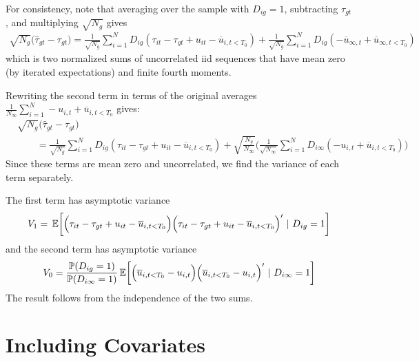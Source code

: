 \documentclass[12pt]{article}
\begin{document}
For consistency, note that averaging over the sample with $D_{ig} = 1$, subtracting $\tau_{gt}$, and multiplying $\sqrt{N_{g}}$ gives
\begin{align}
    \sqrt{N_{g}} \big( \widehat{\tau}_{gt} - \tau_{gt} \big) 
    = \frac{1}{\sqrt{N_{g}}}\sum_{i=1}^N D_{ig} (\tau_{it} - \tau_{gt} + u_{it} - \overline{u}_{i,t < T_0})
    + \frac{1}{\sqrt{N_{g}}}\sum_{i = 1}^N D_{ig} (- \overline{u}_{\infty,t} + \overline{u}_{\infty,t < T_0}) 
\end{align}
which is two normalized sums of uncorrelated iid sequences that have mean zero (by iterated expectations) and finite fourth moments. 

Rewriting the second term in terms of the original averages $\frac{1}{N_\infty} \sum_{i=1}^N - u_{i,t} + \overline{u}_{i,t < T_0}$ gives:
\begin{align*}
    &\sqrt{N_{g}} \big( \widehat{\tau}_{gt} - \tau_{gt} \big) \\
    &\qquad= \frac{1}{\sqrt{N_{g}}}\sum_{i=1}^N D_{ig} (\tau_{it} - \tau_{gt} + u_{it} - \overline{u}_{i,t < T_0})
    + \sqrt{\frac{N_g}{N_\infty}} \bigg ( \frac{1}{\sqrt{N_\infty}} \sum_{i = 1}^N D_{i\infty} (- u_{i,t} + \overline{u}_{i,t < T_0} ) \bigg)
\end{align*}
Since these terms are mean zero and uncorrelated, we find the variance of each term separately. 

The first term has asymptotic variance 
\begin{equation}
V_1 = \expec{\Big( \tau_{it} - \tau_{gt} + u_{it} - \overline{u}_{i,t < T_0} \Big) \Big( \tau_{it} - \tau_{gt} + u_{it} - \overline{u}_{i,t < T_0} \Big)'}{D_{ig} = 1}
\end{equation}
and the second term has asymptotic variance
\begin{equation}
V_0 = \frac{\mathbb{P}(D_{ig} = 1)}{\mathbb{P}(D_{i\infty} = 1)} \expec{ \Big( \overline{u}_{i,t < T_0} - u_{i,t} \Big) \Big( \overline{u}_{i,t < T_0} - u_{i,t} \Big)' }{D_{i\infty} = 1}
\end{equation}
The result follows from the independence of the two sums.




\section{Including Covariates}
\end{document}
